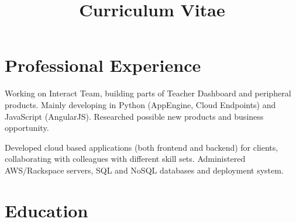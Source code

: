 \documentclass[11pt,a4paper,sans]{moderncv} %
\title{Curriculum Vitae}
\begin{document}
\makecvtitle%

\vspace{-1.5cm}


\section{Professional Experience}

{}{Working on Interact Team, building parts of Teacher Dashboard and peripheral
    products. Mainly developing in Python (AppEngine, Cloud Endpoints) and
    JavaScript (AngularJS). Researched possible new products and business
    opportunity.}

{}{Developed cloud based applications (both frontend and backend) for clients,
    collaborating with colleagues with different skill sets. Administered
    AWS/Rackspace servers, SQL and NoSQL databases and deployment system.}


\section{Education}


\end{document}
